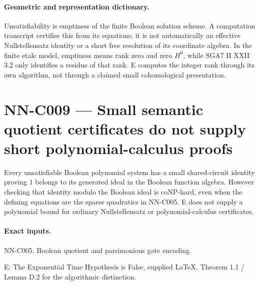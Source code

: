 \paragraph{Geometric and representation dictionary.}
Unsatisfiability is emptiness of the finite Boolean solution scheme. A computation transcript certifies this from its equations; it is not automatically an effective Nullstellensatz identity or a short free resolution of its coordinate algebra. In the finite etale model, emptiness means rank zero and zero $H^0$, while SGA7 II XXII 3.2 only identifies a residue of that rank. E computes the integer rank through its own algorithm, not through a claimed small cohomological presentation.



\section{NN-C009 --- Small semantic quotient certificates do not supply short polynomial-calculus proofs}
\begin{proposition}[NN-C009]
Every unsatisfiable Boolean polynomial system has a small shared-circuit identity proving $1$ belongs to its generated ideal in the Boolean function algebra. However checking that identity modulo the Boolean ideal is coNP-hard, even when the defining equations are the sparse quadratics in NN-C005. E does not supply a polynomial bound for ordinary Nullstellensatz or polynomial-calculus certificates.
\end{proposition}
\paragraph{Exact inputs.}
NN-C005. Boolean quotient and parsimonious gate encoding.

E: The Exponential Time Hypothesis is False, supplied LaTeX. Theorem 1.1 / Lemma D.2 for the algorithmic distinction.

